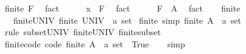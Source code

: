 \begin{isabellebody}
\ {\isachardoublequoteopen}finite\ F{\isachardoublequoteclose}\ \isamarkupfalse%
\ fact\isanewline
\ \ \ \ \isamarkupfalse%
\ {\isachardoublequoteopen}x\ {\isasymnotin}\ F{\isachardoublequoteclose}\ \isamarkupfalse%
\ fact\isanewline
\ \ \ \ \isamarkupfalse%
\ {\isachardoublequoteopen}F\ {\isasymsubseteq}\ A{\isachardoublequoteclose}\ \isamarkupfalse%
\ fact\isanewline
\ \ \isamarkupfalse%
\isanewline
{}\isamarkupfalse%
%
\endisatagproof
{\isafoldproof}%
%
\isadelimproof
%
\endisadelimproof
%
\isadelimdocument
%
\endisadelimdocument
%
\isatagdocument
%
\isamarkuptrue%
%
\endisatagdocument
{\isafolddocument}%
%
\isadelimdocument
%
\endisadelimdocument
{}\isamarkupfalse%
\ finite\ {\isacharequal}{\kern0pt}\isanewline
\ \ \ finite{\isacharunderscore}{\kern0pt}UNIV{\isacharcolon}{\kern0pt}\ {\isachardoublequoteopen}finite\ {\isacharparenleft}{\kern0pt}UNIV\ {\isacharcolon}{\kern0pt}{\isacharcolon}{\kern0pt}\ {\isacharprime}{\kern0pt}a\ set{\isacharparenright}{\kern0pt}{\isachardoublequoteclose}\isanewline
{}\isanewline
\isanewline
{}\isamarkupfalse%
\ finite\ {\isacharbrackleft}{\kern0pt}simp{\isacharbrackright}{\kern0pt}{\isacharcolon}{\kern0pt}\ {\isachardoublequoteopen}finite\ {\isacharparenleft}{\kern0pt}A\ {\isacharcolon}{\kern0pt}{\isacharcolon}{\kern0pt}\ {\isacharprime}{\kern0pt}a\ set{\isacharparenright}{\kern0pt}{\isachardoublequoteclose}\isanewline
%
\isadelimproof
\ \ %
\endisadelimproof
%
\isatagproof
{}\isamarkupfalse%
\ {\isacharparenleft}{\kern0pt}rule\ subset{\isacharunderscore}{\kern0pt}UNIV\ finite{\isacharunderscore}{\kern0pt}UNIV\ finite{\isacharunderscore}{\kern0pt}subset{\isacharparenright}{\kern0pt}{\isacharplus}{\kern0pt}%
\endisatagproof
{\isafoldproof}%
%
\isadelimproof
\isanewline
%
\endisadelimproof
\isanewline
{}\isamarkupfalse%
\ finite{\isacharunderscore}{\kern0pt}code\ {\isacharbrackleft}{\kern0pt}code{\isacharbrackright}{\kern0pt}{\isacharcolon}{\kern0pt}\ {\isachardoublequoteopen}finite\ {\isacharparenleft}{\kern0pt}A\ {\isacharcolon}{\kern0pt}{\isacharcolon}{\kern0pt}\ {\isacharprime}{\kern0pt}a\ set{\isacharparenright}{\kern0pt}\ {\isasymlongleftrightarrow}\ True{\isachardoublequoteclose}\isanewline
%
\isadelimproof
\ \ %
\endisadelimproof
%
\isatagproof
{}\isamarkupfalse%
\ simp%
\endisatagproof
{\isafoldproof}%
%
\isadelimproof
\isanewline
%
\endisadelimproof
\isanewline

\end{isabellebody}
